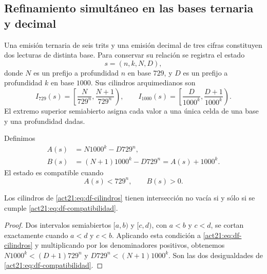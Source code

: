 \subsection{Refinamiento simultáneo en las bases ternaria y decimal}
\label{act21:subsec:df-cilindros-mixtos}


Una emisión ternaria de seis trits y una emisión decimal de tres cifras
constituyen dos lecturas de distinta base. Para conservar su relación se
registra el estado
\[
 s=(n,k,N,D),
\]
donde \(N\) es un prefijo a profundidad \(n\) en base \(729\), y \(D\) es
un prefijo a profundidad \(k\) en base \(1000\). Sus cilindros
arquimedianos son
\begin{equation}
 I_{729}(s)=\left[\frac{N}{729^n},\frac{N+1}{729^n}\right),\qquad
 I_{1000}(s)=\left[\frac{D}{1000^k},\frac{D+1}{1000^k}\right).
 \label{act21:eq:df-cilindros}
\end{equation}
El extremo superior semiabierto asigna cada valor a una única celda de una
base y una profundidad dadas.

\begin{definition}
Definimos
\begin{align}
 A(s)&=N1000^k-D729^n,\label{act21:eq:df-defecto-inferior}\\
 B(s)&=(N+1)1000^k-D729^n=A(s)+1000^k.
 \label{act21:eq:df-defecto-superior}
\end{align}
El estado es compatible cuando
\begin{equation}
 A(s)<729^n,\qquad B(s)>0.
 \label{act21:eq:df-compatibilidad}
\end{equation}
\end{definition}

\begin{lemma}
Los cilindros de \eqref{act21:eq:df-cilindros} tienen intersección no vacía si y
sólo si se cumple \eqref{act21:eq:df-compatibilidad}.
\end{lemma}

\begin{proof}
Dos intervalos semiabiertos \([a,b)\) y \([c,d)\), con \(a<b\) y
\(c<d\), se cortan exactamente cuando \(a<d\) y \(c<b\). Aplicando esta
condición a \eqref{act21:eq:df-cilindros} y multiplicando por los denominadores
positivos, obtenemos
\(N1000^k<(D+1)729^n\) y
\(D729^n<(N+1)1000^k\). Son las dos desigualdades de
\eqref{act21:eq:df-compatibilidad}.
\end{proof}

